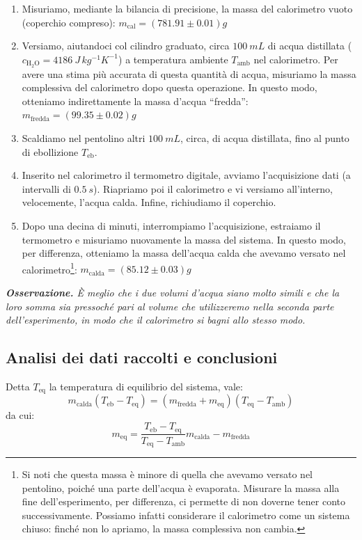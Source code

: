 \documentclass{article}
\begin{document}
\begin{enumerate}
    \item
        Misuriamo, mediante la bilancia di precisione, la massa del
        calorimetro vuoto (coperchio compreso):
        $m_\text{cal} = \left(781.91\pm0.01\right) \unit{g}$
    \item
        Versiamo, aiutandoci col cilindro graduato, circa $\qty{100}{mL}$
        di acqua distillata ($c_{\text{H}_2\text{O}}=\qty{4186}{J\,kg^{-1}K^{-1}}$)
        a temperatura ambiente $T_\text{amb}$ nel calorimetro.
        Per avere una stima più accurata di questa quantità di acqua,
        misuriamo la massa complessiva del calorimetro dopo questa operazione.
        In questo modo, otteniamo indirettamente la massa d'acqua “fredda”:
        $m_\text{fredda} = \left(99.35\pm0.02\right) \unit{g}$
    \item
        Scaldiamo nel pentolino altri $\qty{100}{mL}$, circa, di acqua distillata,
        fino al punto di ebollizione $T_\text{eb}$.
    \item
        Inserito nel calorimetro il termometro digitale, avviamo l'acquisizione dati
        (a intervalli di $\qty{0.5}{s}$).
        Riapriamo poi il calorimetro e vi versiamo all'interno,
        velocemente, l'acqua calda. Infine, richiudiamo il coperchio.
    \item
        Dopo una decina di minuti, interrompiamo l'acquisizione, estraiamo il
        termometro e misuriamo nuovamente la massa del sistema.
        In questo modo, per differenza, otteniamo la massa dell'acqua calda che
        avevamo versato nel calorimetro\footnote{
        Si noti che questa massa è minore di quella che avevamo versato
        nel pentolino, poiché una parte dell'acqua è evaporata. Misurare la massa
        alla fine dell'esperimento, per differenza, ci permette di non doverne
        tener conto successivamente. Possiamo infatti considerare il calorimetro
        come un sistema chiuso: finché non lo apriamo, la massa complessiva
        non cambia.
        }:
        $m_\text{calda} = \left(85.12\pm0.03\right) \unit{g}$
\end{enumerate}

\emph{
\textbf{Osservazione.} È meglio che i due volumi d'acqua siano molto simili e che
la loro somma sia pressoché pari al volume che utilizzeremo nella seconda parte
dell'esperimento, in modo che il calorimetro si bagni allo stesso modo.
}

\subsection{Analisi dei dati raccolti e conclusioni}
Detta $T_\text{eq}$ la temperatura di equilibrio del sistema, vale:
\[
m_\text{calda} (T_\text{eb} - T_\text{eq}) =
(m_\text{fredda} + m_\text{eq})(T_\text{eq} - T_\text{amb})
\]
da cui:
\[
m_\text{eq} = \frac{T_\text{eb}-T_\text{eq}}{T_\text{eq}-T_\text{amb}} m_\text{calda} - m_\text{fredda}
\]
\end{document}
